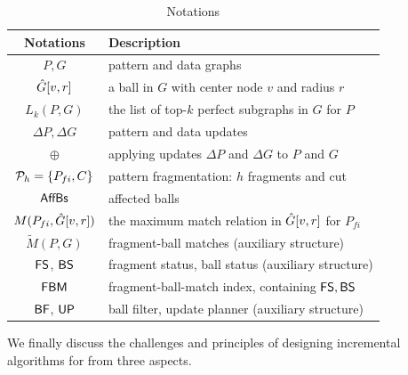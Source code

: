 \begin{table}[tb!]
	\begin{center}
		\begin{small}
			\scriptsize
			\begin{tabular}{|c|l|}
				\hline
				{\bf Notations}             &  {\bf Description}     \\
				\hline\hline
				$P,G$                     &  pattern and data graphs       \\ \hline
				$\hat{G}{[v, r]}$              &  a ball in $G$ with center node $v$ and radius $r$  \\ \hline
				$L_k(P, G)$                  &  the list of top-$k$ perfect subgraphs in $G$ for $P$  \\ \hline
				$\Delta P, \Delta G$       &  pattern and data updates       \\ \hline
				$\oplus$                    &  applying updates $\Delta P$ and $\Delta G$ to $P$ and $G$       \\ \hline
				${\cal P}_{h}=\{P_{fi}, C\}$     &  pattern fragmentation: $h$ fragments and cut    \\ \hline
				${\mathsf{AffBs}}$                &  affected balls       \\ \hline
				$M(P_{fi}, \hat{G}{[v,r]})$    &  the maximum match relation in $\hat{G}{[v,r]}$ for $P_{fi}$   \\ \hline
				$\tilde{M}(P,G)$            &  fragment-ball matches (auxiliary structure)     \\ \hline
				${\mathsf{FS}}$, ${\mathsf{BS}}$              &  fragment status, ball status (auxiliary structure) \\    \hline
				${\mathsf{FBM}}$                       &  fragment-ball-match index, containing ${\mathsf{FS}}, {\mathsf{BS}}$ \\    \hline
				${\mathsf{BF}}$, ${\mathsf{UP}}$              &  ball filter, update planner (auxiliary structure) \\    \hline
			\end{tabular}
			\vspace{-1ex}
		\end{small}
		\caption{Notations}
		\label{tab-notation}
		\vspace{-6ex}
	\end{center}
\end{table}


We finally discuss the challenges and principles of designing incremental algorithms for \dynteamF{} from three aspects.

